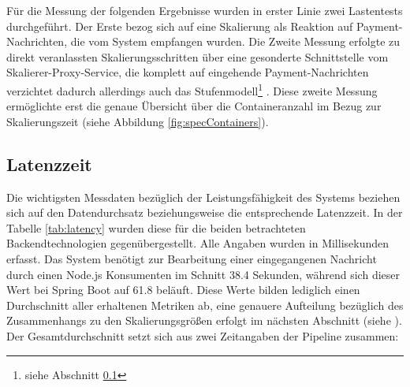 

Für die Messung der folgenden Ergebnisse wurden in erster Linie zwei Lastentests durchgeführt. Der Erste bezog sich auf eine Skalierung als Reaktion auf Payment-Nachrichten, die vom System empfangen wurden. Die Zweite Messung erfolgte zu direkt veranlassten Skalierungsschritten über eine gesonderte Schnittstelle vom Skalierer-Proxy-Service, die komplett auf eingehende Payment-Nachrichten verzichtet dadurch allerdings auch das Stufenmodell\footnote{siehe Abschnitt \ref{}} . Diese zweite Messung ermöglichte erst die genaue Übersicht über die Containeranzahl im Bezug zur Skalierungszeit (siehe Abbildung \ref{fig:specContainers}).


\subsection{Latenzzeit \checkmark}
Die wichtigsten Messdaten bezüglich der Leistungsfähigkeit des Systems beziehen sich auf den Datendurchsatz beziehungsweise die entsprechende Latenzzeit. In der Tabelle \ref{tab:latency} wurden diese für die beiden betrachteten Backendtechnologien gegenübergestellt. Alle Angaben wurden in Millisekunden erfasst. Das System benötigt zur Bearbeitung einer eingegangenen Nachricht durch einen Node.js Konsumenten im Schnitt 38.4 Sekunden, während sich dieser Wert bei Spring Boot auf 61.8 beläuft. Diese Werte bilden lediglich einen Durchschnitt aller erhaltenen Metriken ab, eine genauere Aufteilung bezüglich des Zusammenhangs zu den Skalierungsgrößen erfolgt im nächsten Abschnitt (siehe ). Der Gesamtdurchschnitt setzt sich aus zwei Zeitangaben der Pipeline zusammen: 

